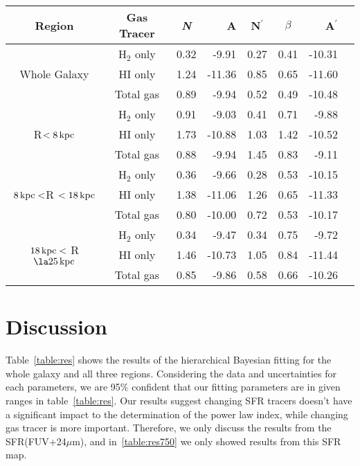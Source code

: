 \documentclass[useAMS,usenatbib]{mn2e}
\newcommand \kpc        {\,{\rm kpc}}
\newcommand \nprime {N$^\prime$}
\begin{document}
\begin{table*}
\caption{Similar to table~\ref{table:res} but here the fitting performed on the regions with size of 750~pc, and we only showed the results from SFR(FUV+24$\mu$m).}
\label{table:res750}
\begin{tabular}{cccrccrr}
\hline\hline
\multicolumn{1}{c}{\multirow{1}{*}{Region}}  & Gas Tracer & {\it N} & A  & \nprime & $\beta$ & A$^\prime$ \\
\hline
\multicolumn{1}{c}{\multirow{3}{*}{Whole Galaxy}}
 & H$_2$ only & 0.32 & -9.91   & 0.27  & 0.41    &  -10.31  \\
 & HI only    & 1.24 & -11.36  & 0.85  & 0.65    & -11.60     \\
 & Total gas  & 0.89 & -9.94 & 0.52    & 0.49    & -10.48     \\
\hline
\multicolumn{1}{c}{\multirow{3}{*}{R$< 8\kpc$}}
 & H$_2$ only & 0.91 & -9.03  & 0.41   & 0.71   & -9.88      \\
 & HI only    & 1.73 & -10.88 & 1.03    & 1.42    & -10.52     \\
 & Total gas  & 0.88 & -9.94  & 1.45    & 0.83    & -9.11      \\
\hline
\multicolumn{1}{c}{\multirow{3}{*}{$8\kpc < $R $< 18\kpc$}}
 & H$_2$ only & 0.36 & -9.66  & 0.28    &  0.53   & -10.15       \\
 & HI only    & 1.38 & -11.06 & 1.26    & 0.65    & -11.33     \\
 & Total gas  & 0.80 & -10.00 & 0.72    & 0.53    & -10.17     \\
\hline
\multicolumn{1}{c}{\multirow{3}{*}{$18\kpc <$ R $\la 25\kpc$}} 
 & H$_2$ only & 0.34 & -9.47  &  0.34    & 0.75    & -9.72   \\
 & HI only    & 1.46 & -10.73  & 1.05    & 0.84    & -11.44     \\
 & Total gas  & 0.85 & -9.86 & 0.58    & 0.66    & -10.26     \\
 \hline
\end{tabular}
\end{table*}



%
\section{Discussion}

Table~\ref{table:res} shows the results of the hierarchical Bayesian fitting for the whole galaxy and all three regions. Considering the data and uncertainties for each parameters, we are 95$\%$ confident that our fitting parameters are in given ranges in table~\ref{table:res}. Our results suggest changing SFR tracers doesn't have a significant impact to the determination of the power law index, while changing gas tracer is more important. Therefore, we only discuss the results from the SFR(FUV+24$\mu$m), and in~\ref{table:res750} we only showed results from this SFR map.
\end{document}
